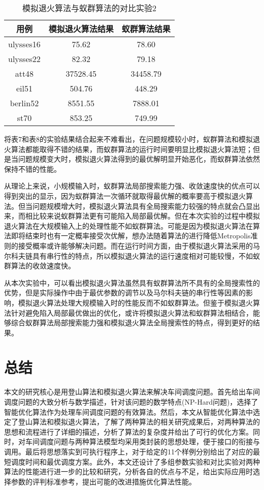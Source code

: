 \documentclass[UTF8]{ctexart}
\begin{document}
\begin{table} 
	\centering
	\caption{模拟退火算法与蚁群算法的对比实验2}
	\begin{tabular}{ccc} %
		\toprule %
		用例 & 模拟退火算法结果 & 蚁群算法结果\\
		\hline %
		ulysses16 & 75.62 & 78.60 \\
		ulysses22 & 82.32 & 79.18\\
		att48 & 37528.45 & 34458.79\\
		eil51 & 504.76 & 448.29\\
		berlin52 & 8551.55 & 7888.01\\
		st70 & 853.25 & 749.99\\
		\bottomrule %
	\end{tabular}
\end{table}

将表7和表8的实验结果结合起来不难看出，在问题规模较小时，蚁群算法和模拟退火算法都能取得不错的结果，而蚁群算法的运行时间要明显比模拟退火算法短；但是当问题规模变大时，模拟退火算法得到的最优解明显开始恶化，而蚁群算法依然保持不错的性能。

从理论上来说，小规模输入时，蚁群算法局部搜索能力强、收敛速度快的优点可以得到突出的显示，因为蚁群算法一次循环就取得最优解的概率要高于模拟退火算法。但当问题规模增大时，模拟退火算法具有全局搜索能力较强的特点就会凸显出来，而相比较来说蚁群算法更有可能陷入局部最优解。但在本次实验的过程中模拟退火算法在大规模输入上的处理性能不如蚁群算法。可能是因为模拟退火算法在算法即将结束时也有一定概率接受次优解，想办法随着算法的进行降低Metropolis准则的接受概率或许能够解决问题。而在运行时间方面，由于模拟退火算法采用的马尔科夫链具有串行性的特点，所以模拟退火算法的运行速度相对可能较慢，不如蚁群算法的收敛速度快。

从本次实验中，可以看出模拟退火算法虽然具有蚁群算法所不具有的全局搜索性的优势，但是实际操作中由于最优参数的调节以及马尔科夫链的串行性等因素的影响，模拟退火算法处理大规模输入时的性能反而不如蚁群算法。但鉴于模拟退火算法针对避免陷入局部最优做出的优化，或许将模拟退火算法和蚁群算法相结合，能够综合蚁群算法局部搜索能力强和模拟退火算法全局搜索性的特点，得到更好的结果。


\section{总结}
本文的研究核心是用登山算法和模拟退火算法来解决车间调度问题。首先给出车间调度问题的大致分析与数学描述，针对该问题的数学特点(NP-Hard问题)，选择了智能优化算法作为处理车间调度问题的有效算法。然后，本文从智能优化算法中选定了登山算法和模拟退火算法，了解了两种算法的相关研究成果后，对两种算法的思想和流程进行了详细的描述，分析了算法的复杂度并给出了可行的优化方案。同时，对车间调度问题与两种算法模型均采用类封装的思想处理，便于接口的衔接与调用。最后将思想落实到可执行程序上，对于给定的11个样例分别给出了对应的最短调度时间和最优调度方案。此外，本文还设计了多组参数实验和对比实验对两种算法的性能进行进一步的比较和研究，分析各自的优点与不足，给出实际应用时选择参数的评判标准参考，提出可能的改进措施优化算法性能。\\
\end{document}
